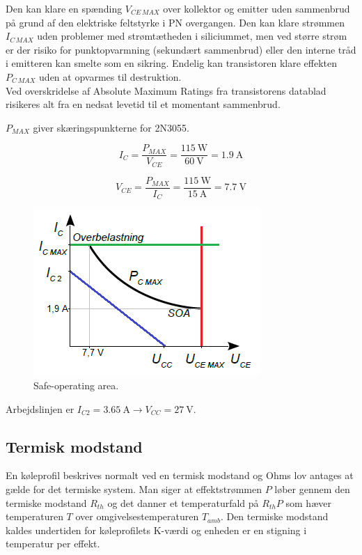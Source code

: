 \documentclass[danish]{article}
\begin{document}
Den kan klare en spænding $V_{CE\,MAX}$ over kollektor og emitter uden sammenbrud på grund af den elektriske feltstyrke i PN overgangen. 
Den kan klare strømmen $I_{C\,MAX}$ uden problemer med strømtætheden i siliciummet, men ved større strøm er der risiko for punktopvarmning (sekundært sammenbrud) eller den interne tråd i emitteren kan smelte som en sikring.
Endelig kan transistoren klare effekten $P_{C\,MAX}$ uden at opvarmes til destruktion.\\

Ved overskridelse af Absolute Maximum Ratings fra transistorens datablad risikeres alt fra en nedsat levetid til et momentant sammenbrud.

\newpage
$P_{MAX}$ giver skæringspunkterne for 2N3055.

\begin{equation}
I_C = \dfrac{P_{MAX}}{V_{CE}} = \dfrac{\SI{115}{\watt}}{\SI{60}{\volt}} = \SI{1.9}{\ampere}
\end{equation}

\begin{equation}
V_{CE} = \dfrac{P_{MAX}}{I_C} = \dfrac{\SI{115}{\watt}}{\SI{15}{\ampere}} = \SI{7.7}{\volt}
\end{equation}

\begin{figure} [H]
	\centering
	\includegraphics[width=0.45\linewidth]{graphics/soa}
	\caption{Safe-operating area.}
	\label{fig:soa}
\end{figure}

Arbejdslinjen er $I_{C2} = \SI{3.65}{\ampere} \rightarrow V_{CC} = \SI{27}{\volt}$.

\subsection{Termisk modstand}
En køleprofil beskrives normalt ved en termisk modstand og Ohms lov antages at gælde for det termiske system. 
Man siger at effektstrømmen $P$ løber gennem den termiske modstand $R_{th}$ og det danner et temperaturfald på $R_{th}P$ som hæver temperaturen $T$ over omgivelsestemperaturen $T_{amb}$.
Den termiske modstand kaldes undertiden for køleprofilets K-værdi og enheden er en stigning i temperatur per effekt.
\end{document}

